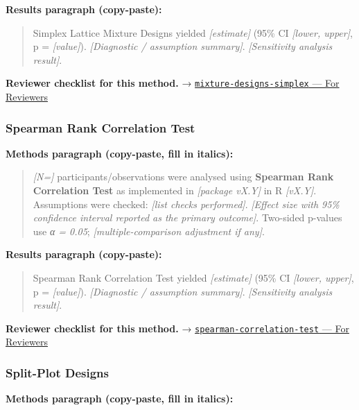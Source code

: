 \documentclass[
]{article}
\begin{document}
\textbf{Results paragraph (copy-paste):}

\begin{quote}
Simplex Lattice Mixture Designs yielded \emph{{[}estimate{]}} (95\% CI
\emph{{[}lower, upper{]}}, p = \emph{{[}value{]}}). \emph{{[}Diagnostic
/ assumption summary{]}}. \emph{{[}Sensitivity analysis result{]}}.
\end{quote}

\textbf{Reviewer checklist for this method.} →
\href{../chapters/16-design/mixture-designs-simplex.Rmd\#for-reviewers}{\texttt{mixture-designs-simplex}
--- For Reviewers}

\subsubsection{Spearman Rank Correlation
Test}\label{spearman-rank-correlation-test}

\textbf{Methods paragraph (copy-paste, fill in italics):}

\begin{quote}
\emph{{[}N={]}} participants/observations were analysed using
\textbf{Spearman Rank Correlation Test} as implemented in
\emph{{[}package vX.Y{]}} in R \emph{{[}vX.Y{]}}. Assumptions were
checked: \emph{{[}list checks performed{]}}. \emph{{[}Effect size with
95\% confidence interval reported as the primary outcome{]}}. Two-sided
p-values use \emph{α = 0.05}; \emph{{[}multiple-comparison adjustment if
any{]}}.
\end{quote}

\textbf{Results paragraph (copy-paste):}

\begin{quote}
Spearman Rank Correlation Test yielded \emph{{[}estimate{]}} (95\% CI
\emph{{[}lower, upper{]}}, p = \emph{{[}value{]}}). \emph{{[}Diagnostic
/ assumption summary{]}}. \emph{{[}Sensitivity analysis result{]}}.
\end{quote}

\textbf{Reviewer checklist for this method.} →
\href{../chapters/04-inferential/spearman-correlation-test.Rmd\#for-reviewers}{\texttt{spearman-correlation-test}
--- For Reviewers}

\subsubsection{Split-Plot Designs}\label{split-plot-designs}

\textbf{Methods paragraph (copy-paste, fill in italics):}
\end{document}
